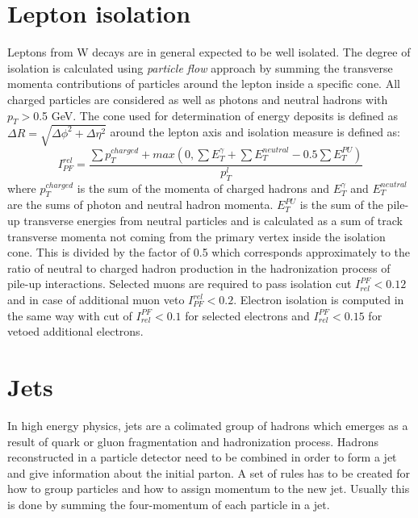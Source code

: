 \section{Lepton isolation}
Leptons from W decays are in general expected to be well isolated. The degree of isolation is calculated using \textit{particle flow} approach by summing the transverse momenta contributions of particles around the lepton inside a specific cone. All charged particles are considered as well as photons and neutral hadrons with $p_T>$0.5 GeV. The cone used for determination of energy deposits is defined as $\Delta R = \sqrt{\Delta \phi^2+ \Delta \eta^2}$ around the lepton axis and isolation measure is defined as:
\begin{equation}
I_{PF}^{rel} = \frac{\sum p_T^{charged} + max(0, \sum E_T^{\gamma}+\sum E_T^{neutral}-0.5\sum E_T^{PU})}{p_T^l}
\end{equation}
where $p_T^{charged}$ is the sum of the momenta of charged hadrons and $E_T^{\gamma} $ and $E_T^{neutral}$ are the sums of photon and neutral hadron momenta. $E_T^{PU}$ is the sum of the pile-up transverse energies from neutral particles and is calculated as a sum of track transverse momenta not coming from the primary vertex inside the isolation cone. This is divided by the factor of 0.5 which corresponds approximately to the ratio of neutral to charged hadron production in the hadronization process of pile-up interactions. Selected muons are required to pass isolation cut $I_{rel}^{PF}<0.12$ and in case of additional muon veto $I_{PF}^{rel}<0.2$. Electron isolation is computed in the same way with cut of $I_{rel}^{PF}<0.1$ for selected electrons and $I_{rel}^{PF}<0.15$ for vetoed additional electrons.



\section{Jets}

In high energy physics, jets are a colimated group of hadrons which emerges as a result of quark or gluon fragmentation and hadronization process. Hadrons reconstructed in a particle detector need to be combined in order to form a jet and give information about the initial parton. A set of rules has to be created for how to group particles and how to assign momentum to the new jet. Usually this is done by summing the four-momentum of each particle in a jet.


